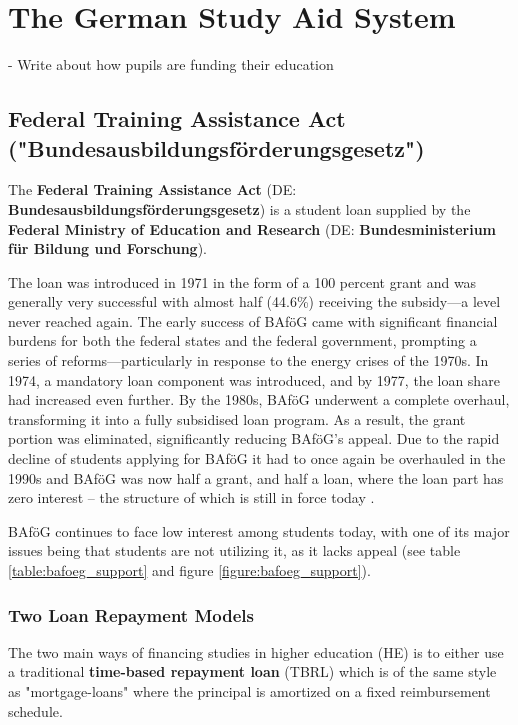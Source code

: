 \section{The German Study Aid System} 
\label{section:the-german-study-aid-system}


- Write about how pupils are funding their education 



\subsection{Federal Training Assistance Act ("Bundesausbildungsförderungsgesetz") } 
\label{subsection:federal-training-assistance-act}
The \textbf{Federal Training Assistance Act} (DE: \textbf{Bundesausbildungsförderungsgesetz}) is a student loan supplied by the \textbf{Federal Ministry of Education and Research} (DE: \textbf{Bundesministerium für Bildung und Forschung}). 

The loan was introduced in 1971 in the form of a 100 percent grant and was generally very successful with almost half (44.6\%) receiving the subsidy---a level never reached again. 
The early success of BAföG came with significant financial burdens for both the federal states and the federal government, prompting a series of reforms—particularly in response to the energy crises of the 1970s. In 1974, a mandatory loan component was introduced, and by 1977, the loan share had increased even further. By the 1980s, BAföG underwent a complete overhaul, transforming it into a fully subsidised loan program. As a result, the grant portion was eliminated, significantly reducing BAföG's appeal.
Due to the rapid decline of students applying for BAföG it had to once again be overhauled in the 1990s and BAföG was now half a grant, and half a loan, where the loan part has zero interest -- the structure of which is still in force today \citep{lost_geschichte_2025}.

BAföG continues to face low interest among students today, with one of its major issues being that students are not utilizing it, as it lacks appeal (see table \ref{table:bafoeg_support} and figure \ref{figure:bafoeg_support}). 

\subsubsection{Two Loan Repayment Models}
\label{subsection:loan-repayment-plan}
The two main ways of financing studies in higher education (HE) is to either use a traditional 
\textbf{time-based repayment loan} (TBRL) which is of the same style as "mortgage-loans" 
where the principal is amortized on a fixed reimbursement schedule.

